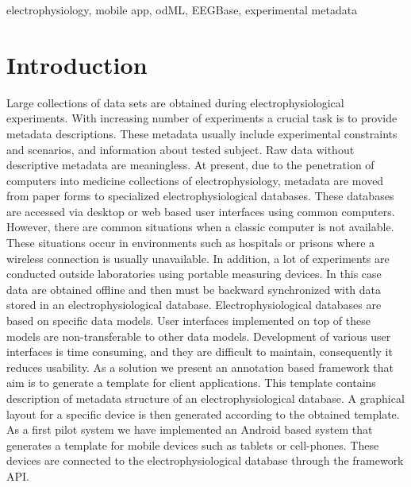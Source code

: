 \documentclass[conference]{IEEEtran}
\begin{document}

\begin{IEEEkeywords}
 electrophysiology, mobile app, odML, EEGBase, experimental metadata
\end{IEEEkeywords}


%
\IEEEpeerreviewmaketitle



\section{Introduction}\label{Introduction}

Large collections of data sets are obtained during electrophysiological experiments. With increasing number of experiments a crucial task is to provide metadata descriptions. These metadata usually include experimental constraints and scenarios, and information about tested subject. Raw data without descriptive metadata are meaningless. At present, due to the penetration of computers into medicine collections of electrophysiology, metadata are moved from paper forms to specialized electrophysiological databases. These databases are accessed via desktop or web based user interfaces using common computers. However, there are common situations when a classic computer is not available. These situations occur in environments such as hospitals or prisons where a wireless connection is usually unavailable. In addition, a lot of experiments are conducted outside laboratories using portable measuring devices. In this case data are obtained offline and then must be backward synchronized with data stored in an electrophysiological database. Electrophysiological databases are based on specific data models. User interfaces implemented on top of these models are non-transferable to other data models. Development of various user interfaces is time consuming, and they are difficult to maintain, consequently it reduces usability. As a solution we present an annotation based framework that aim is to generate a template for client applications. This template contains description of metadata structure of an electrophysiological database. A graphical layout for a specific device is then generated according to the obtained template.  As a first pilot system we have implemented an Android based system that generates a template for mobile devices such as tablets or cell-phones. These devices are connected to the electrophysiological database through the framework API.
\end{document}
